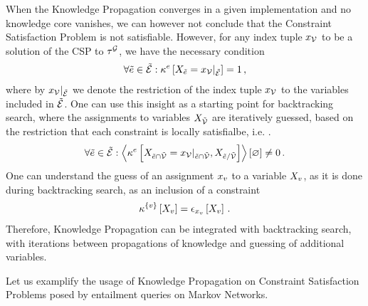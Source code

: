 When the Knowledge Propagation  converges in a given implementation and no knowledge core vanishes, we can however not conclude that the Constraint Satisfaction Problem is not satisfiable.
However, for any index tuple $x_{\mathcal{V}}$ to be a solution of the CSP to $\tau^{\mathcal{G}}$, we have the necessary condition
\begin{align*}
    \forall{\tilde{e}\in\tilde{\mathcal{E}}}:{\kappa^{e}\left[X_{\tilde{e}}={x_{\mathcal{V}}}|_{\tilde{\mathcal{E}}}\right]=1} \, ,
\end{align*}
where by ${x_{\mathcal{V}}}|_{\tilde{\mathcal{E}}}$ we denote the restriction of the index tuple $x_{\mathcal{V}}$ to the variables included in $\tilde{\mathcal{E}}$.
One can use this insight as a starting point for backtracking search, where the assignments to variables $X_{\tilde{\mathcal{V}}}$ are iteratively guessed, based on the restriction that each constraint is locally satisfialbe, i.e. .
\begin{align*}
    \forall{\tilde{e}\in\tilde{\mathcal{E}}}:{
        \left\langle \kappa^{e}\left[
            X_{\tilde{e}\cap\tilde{\mathcal{V}}}={x_{\mathcal{V}}}|_{\tilde{e}\cap\tilde{\mathcal{V}}}
            ,X_{\tilde{e}/\tilde{\mathcal{V}}}\right]\right\rangle \left[ \varnothing \right] \neq 0
    } \, .
\end{align*}
One can understand the guess of an assignment $x_{v}$ to a variable $X_{v}$, as it is done during backtracking search, as an inclusion of a constraint
\begin{align*}
    \kappa^{\{v\}}\left[X_{v}\right]
    = \epsilon_{x_{v}}\left[X_{v}\right] \, .
\end{align*}
Therefore, Knowledge Propagation  can be integrated with backtracking search, with iterations between propagations of knowledge and guessing of additional variables.




Let us examplify the usage of Knowledge Propagation on Constraint Satisfaction Problems posed by entailment queries on Markov Networks.

